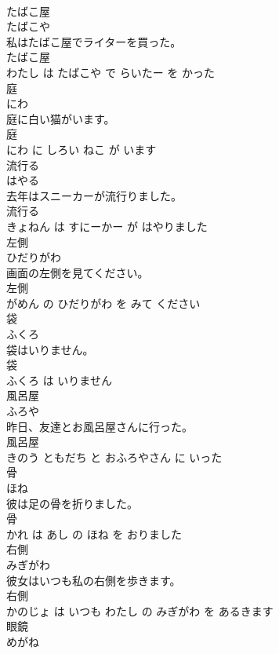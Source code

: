 \documentclass[8pt]{extreport}
\begin{document}
\begin{CJK}{UTF8}{min}
\\	たばこ屋	
\\	たばこや			
\\	私はたばこ屋でライターを買った。	
\\	たばこ屋 
\\	わたし は たばこや で らいたー を かった			
\\	庭	
\\	にわ			
\\	庭に白い猫がいます。	
\\	庭 
\\	にわ に しろい ねこ が います			
\\	流行る	
\\	はやる			
\\	去年はスニーカーが流行りました。	
\\	流行る 
\\	きょねん は すにーかー が はやりました			
\\	左側	
\\	ひだりがわ			
\\	画面の左側を見てください。	
\\	左側 
\\	がめん の ひだりがわ を みて ください			
\\	袋	
\\	ふくろ			
\\	袋はいりません。	
\\	袋 
\\	ふくろ は いりません			
\\	風呂屋	
\\	ふろや			
\\	昨日、友達とお風呂屋さんに行った。	
\\	風呂屋 
\\	きのう ともだち と おふろやさん に いった			
\\	骨	
\\	ほね			
\\	彼は足の骨を折りました。	
\\	骨 
\\	かれ は あし の ほね を おりました			
\\	右側	
\\	みぎがわ			
\\	彼女はいつも私の右側を歩きます。	
\\	右側 
\\	かのじょ は いつも わたし の みぎがわ を あるきます			
\\	眼鏡	
\\	めがね			

\end{CJK}
\end{document}
